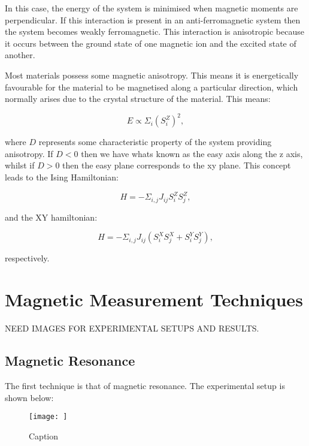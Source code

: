 \noindent In this case, the energy of the system is minimised when magnetic moments are perpendicular. If this interaction is present in an anti-ferromagnetic system then the system becomes weakly ferromagnetic. This interaction is anisotropic because it occurs between the ground state of one magnetic ion and the excited state of another.

\noindent Most materials possess some magnetic anisotropy. This means it is energetically favourable for the material to be magnetised along a particular direction, which normally arises due to the crystal structure of the material. This means:

\begin{equation}
    E \propto \Sigma_i (S^Z_i)^2,
    \label{MagneticAnisotropyEnergy}
\end{equation}

\noindent where $D$ represents some characteristic property of the system providing anisotropy. If $D < 0$ then we have whats known as the easy axis along the z axis, whilst if $D > 0$ then the easy plane corresponds to the xy plane. This concept leads to the Ising Hamiltonian:

\begin{equation}
    H = -\Sigma_{i,j} J_{ij} S^Z_i S^Z_j,
    \label{IsingHamiltonian}
\end{equation}

\noindent and the XY hamiltonian:

\begin{equation}
    H = -\Sigma_{i,j} J_{ij} (S^X_i S^X_j + S^Y_i S^Y_j),
    \label{HamiltonianXY}
\end{equation}

\noindent respectively.

\section{Magnetic Measurement Techniques}

NEED IMAGES FOR EXPERIMENTAL SETUPS AND RESULTS.

\subsection{Magnetic Resonance}

The first technique is that of magnetic resonance. The experimental setup is shown below:

\begin{figure}
    \centering
    \texttt{[image: ]}
    \caption{Caption}
    \label{fig:enter-label}
\end{figure}

